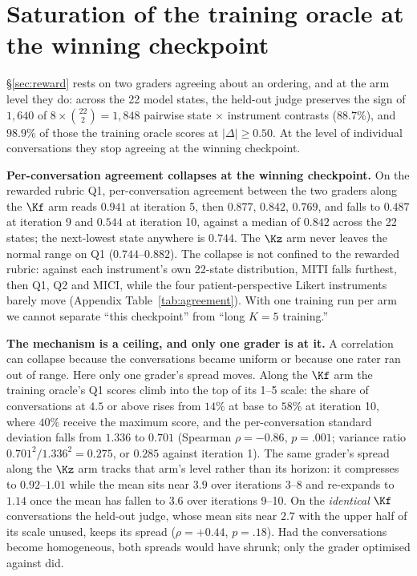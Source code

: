 \section{Saturation of the training oracle at the winning checkpoint}
\label{sec:measurement}



\S\ref{sec:reward} rests on two graders agreeing about an ordering, and at the arm level they do:
across the 22 model states, the held-out judge preserves the sign of $1{,}640$ of
$8 \times \binom{22}{2} = 1{,}848$ pairwise state $\times$ instrument contrasts ($88.7\%$), and
$98.9\%$ of those the training oracle scores at $|\Delta| \geq 0.50$. At the level of individual
conversations they stop agreeing at the winning checkpoint.

\textbf{Per-conversation agreement collapses at the winning checkpoint.} On the rewarded rubric
Q1, per-conversation agreement between the two graders along the $\Kf$ arm reads $0.941$ at
iteration 5, then $0.877$, $0.842$, $0.769$, and falls to $\mathbf{0.487}$ at iteration 9 and
$\mathbf{0.544}$ at iteration 10, against a median of $0.842$ across the 22 states; the next-lowest
state anywhere is $0.744$. The $\Kz$ arm never leaves the normal
range on Q1 ($0.744$--$0.882$). The collapse is not confined to the rewarded rubric: against each
instrument's own 22-state distribution, MITI falls furthest, then Q1, Q2 and MICI, while the four
patient-perspective Likert instruments barely move (Appendix Table~\ref{tab:agreement}). With one
training run per arm we cannot separate ``this checkpoint'' from ``long $K{=}5$ training.''

\textbf{The mechanism is a ceiling, and only one grader is at it.} A correlation can collapse
because the conversations became uniform or because one rater ran out of range. Here only one
grader's spread moves. Along the $\Kf$ arm the
training oracle's Q1 scores climb into the top of its 1--5 scale: the share of conversations at
$4.5$ or above rises from $14\%$ at base to $58\%$ at iteration 10, where $40\%$ receive the
maximum score, and the per-conversation standard deviation falls
from $1.336$ to $0.701$ (Spearman $\rho = -0.86$, $p = .001$; variance ratio
$0.701^2/1.336^2 = 0.275$, or $0.285$ against iteration 1). The same grader's spread along the
$\Kz$ arm tracks that arm's level rather than its horizon: it compresses to $0.92$--$1.01$ while
the mean sits near $3.9$ over iterations 3--8 and re-expands to $1.14$ once the mean has fallen to
$3.6$ over iterations 9--10. On the \emph{identical} $\Kf$ conversations the held-out judge, whose
mean sits near $2.7$ with the upper half of its scale unused, keeps its spread ($\rho = +0.44$,
$p = .18$). Had the conversations become homogeneous, both spreads would have shrunk; only the
grader optimised against did.

